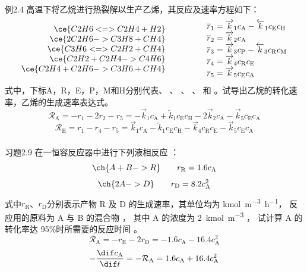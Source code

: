 \begin{frame}[t]
    \frametitle{}
    \vspace{-5pt}
    \begin{block}{例2.4}
        高温下将乙烷进行热裂解以生产乙烯，其反应及速率方程如下：
		$$\begin{array}{r}
		\ce{C2H6 <=> C2H4 + H2}\\
		\ce{2C2H6 -> C3H8 + CH4}\\
		\ce{C3H6 <=> C2H2 + CH4}\\
		\ce{C2H2 + C2H4 -> C4H6}\\
		\ce{C2H4 + C2H6 -> C3H6 + CH4}
	\end{array}~~~~~~~~~~~~
	\begin{array}{l}
		\overline{r}_1=\overrightarrow{k}_1c_\mathrm{A}-\overleftarrow{k}_1c_\mathrm{E}c_\mathrm{H}\\
		\overline{r}_2=\overrightarrow{k}_2c_\mathrm{A}\\
		\overline{r}_3=\overrightarrow{k}_3c_\mathrm{P}-\overleftarrow{k}_3c_\mathrm{R}c_\mathrm{M}\\
		\overline{r}_4=\overrightarrow{k}_4c_\mathrm{R}c_\mathrm{E}\\
		\overline{r}_5=\overrightarrow{k}_5c_\mathrm{E}c_\mathrm{A}
	\end{array}$$
    式中，下标A，R，E，P，M和H分别代表、 、 、 、 和 。试导出乙烷的转化速率，乙烯的生成速率表达式。
    \tcblower
    \pause
        \[
            \mathcal{R}_\mathrm{A} = -r_\mathrm{1} - 2r_\mathrm{2} - r_\mathrm{5} = -\overrightarrow{k}_1c_\mathrm{A} + \overleftarrow{k}_1c_\mathrm{E}c_\mathrm{H} - 2\overrightarrow{k}_2c_\mathrm{A} - \overrightarrow{k}_5c_\mathrm{E}c_\mathrm{A}
        \]
        \[
            \mathcal{R}_\mathrm{E} = r_\mathrm{1} - r_\mathrm{4} - r_\mathrm{5} = \overrightarrow{k}_1c_\mathrm{A}-\overleftarrow{k}_1c_\mathrm{E}c_\mathrm{H} - \overrightarrow{k}_4c_\mathrm{R}c_\mathrm{E} - \overrightarrow{k}_5c_\mathrm{E}c_\mathrm{A}
        \]
    \end{block}
\end{frame}


\begin{frame}[t]
    \frametitle{}
    \begin{redblock}{习题2.9}
        在一恒容反应器中进行下列液相反应 ：
        \[
            \ch{A + B -> R} \qquad r_\mathrm{R} = 1.6 c_\mathrm{A}
        \]
        \[
            \ch{2 A -> D}  \qquad r_\mathrm{D} = 8.2 c_\mathrm{A}^2
        \]
        式中$r_\mathrm{R}$、$r_\mathrm{D}$分别表示产物 R 及 D 的生成速率，其单位均为 \si{kmol.m^{-3}.h^{-1}}， 反应用的原料为 A 与 B 的混合物 ， 其中 A 的浓度为 \SI{2}{kmol.m^{-3}} ， 试计算 A 的转化率达 95\%时所需要的反应时间 。
        \tcblower
        \pause
        \[
            \mathcal{R}_\mathrm{A} = -r_\mathrm{R} - 2r_\mathrm{D} = -1.6 c_\mathrm{A} - 16.4c_\mathrm{A}^2
        \]
        \[
            -\frac{\dif c_\mathrm{A}}{\dif t} = -\mathcal{R}_\mathrm{A} = 1.6 c_\mathrm{A} + 16.4 c_\mathrm{A}^2
        \]
    \end{redblock}
\end{frame}


